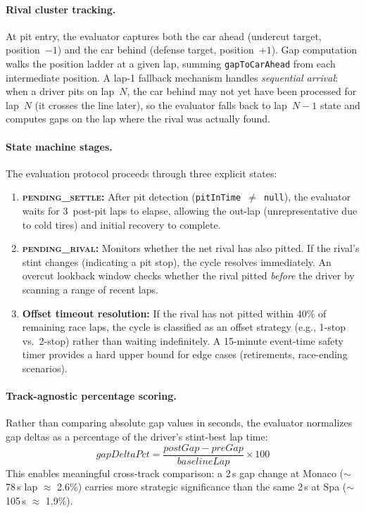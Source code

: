 \documentclass[a4paper,twocolumn]{article}
\begin{document}
\paragraph{Rival cluster tracking.}
At pit entry, the evaluator captures both the car ahead (undercut
target, position~$-1$) and the car behind (defense target,
position~$+1$). Gap computation walks the position ladder at a given
lap, summing \texttt{gapToCarAhead} from each intermediate position.
A lap-1 fallback mechanism handles \emph{sequential arrival}: when a
driver pits on lap~$N$, the car behind may not yet have been processed
for lap~$N$ (it crosses the line later), so the evaluator falls back to
lap~$N-1$ state and computes gaps on the lap where the rival was
actually found.

\paragraph{State machine stages.}
The evaluation protocol proceeds through three explicit states:
\begin{enumerate}
  \item \textbf{\textsc{pending\_settle}:} After pit detection
    (\texttt{pitInTime $\neq$ null}), the evaluator waits for 3~post-pit
    laps to elapse, allowing the out-lap (unrepresentative due to cold
    tires) and initial recovery to complete.
  \item \textbf{\textsc{pending\_rival}:} Monitors whether the net rival
    has also pitted. If the rival's stint changes (indicating a pit stop),
    the cycle resolves immediately. An overcut lookback window checks
    whether the rival pitted \emph{before} the driver by scanning a range
    of recent laps.
  \item \textbf{Offset timeout resolution:} If the rival has not pitted
    within 40\% of remaining race laps, the cycle is classified as an
    offset strategy (e.g., 1-stop vs.\ 2-stop) rather than waiting
    indefinitely. A 15-minute event-time safety timer provides a hard
    upper bound for edge cases (retirements, race-ending scenarios).
\end{enumerate}

\paragraph{Track-agnostic percentage scoring.}
Rather than comparing absolute gap values in seconds, the evaluator
normalizes gap deltas as a percentage of the driver's stint-best lap
time:
\[
  \mathit{gapDeltaPct} = \frac{\mathit{postGap} - \mathit{preGap}}{\mathit{baselineLap}} \times 100
\]
This enables meaningful cross-track comparison: a 2\,s gap change at
Monaco ($\sim$78\,s lap $\approx$ 2.6\%) carries more strategic
significance than the same 2\,s at Spa ($\sim$105\,s $\approx$ 1.9\%).
\end{document}

